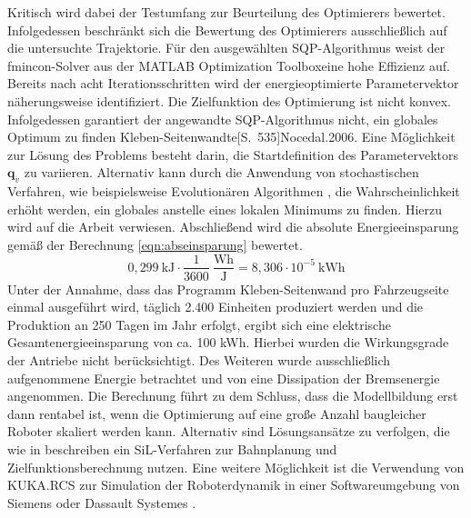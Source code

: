 Kritisch wird dabei der Testumfang zur Beurteilung des Optimierers bewertet. Infolgedessen beschränkt sich die Bewertung des Optimierers ausschließlich auf die untersuchte Trajektorie. Für den ausgewählten SQP-Algorithmus weist der fmincon-Solver aus der MATLAB\textsuperscript{\textregistered} Optimization Toolbox\texttrademark eine hohe Effizienz auf. Bereits nach acht Iterationsschritten wird der energieoptimierte Parametervektor näherungsweise identifiziert. Die Zielfunktion des Optimierung ist nicht konvex. Infolgedessen garantiert der angewandte SQP-Algorithmus nicht, ein globales Optimum zu finden Kleben-Seitenwandte[S.~535]{Nocedal.2006}. Eine Möglichkeit zur Lösung des Problems besteht darin, die Startdefinition des Parametervektors $\bm{q}_v$ zu variieren.  Alternativ kann durch die Anwendung von stochastischen Verfahren, wie beispielsweise Evolutionären Algorithmen \cite[S.~]{Papageorgiou.2015}, die Wahrscheinlichkeit erhöht werden, ein globales anstelle eines lokalen Minimums zu finden.  Hierzu wird auf die Arbeit \cite{Nonoyama.2022} verwiesen. 
%
Abschließend wird die absolute Energieeinsparung gemäß der Berechnung \ref{eqn:abseinsparung} bewertet. 
% 
\begin{equation}
	\label{eqn:abseinsparung}
	 0,299~\text{kJ} \cdot \dfrac{1}{3600}~ \dfrac{\text{Wh}}{\text{J}} = 8,306 \cdot 10^{-5}~\text{kWh}
\end{equation}
%
Unter der Annahme, dass das Programm Kleben-Seitenwand pro Fahrzeugseite einmal ausgeführt wird, täglich 2.400 Einheiten produziert werden und die Produktion an 250 Tagen im Jahr erfolgt, ergibt sich eine elektrische Gesamtenergieeinsparung von ca. 100 kWh. Hierbei wurden die Wirkungsgrade der Antriebe nicht berücksichtigt. Des Weiteren wurde ausschließlich aufgenommene Energie betrachtet und von eine Dissipation der Bremsenergie angenommen. Die Berechnung führt zu dem Schluss, dass die Modellbildung erst dann rentabel ist, wenn die Optimierung auf eine große Anzahl baugleicher Roboter skaliert werden kann. Alternativ sind Lösungsansätze zu verfolgen, die wie in \cite[S.~40]{Eggers.2019} beschreiben ein SiL-Verfahren zur Bahnplanung und Zielfunktionsberechnung nutzen. Eine weitere Möglichkeit ist die Verwendung von KUKA.RCS zur Simulation der Roboterdynamik in einer Softwareumgebung von Siemens oder Dassault Systemes \cite{RCS.2019}. 
